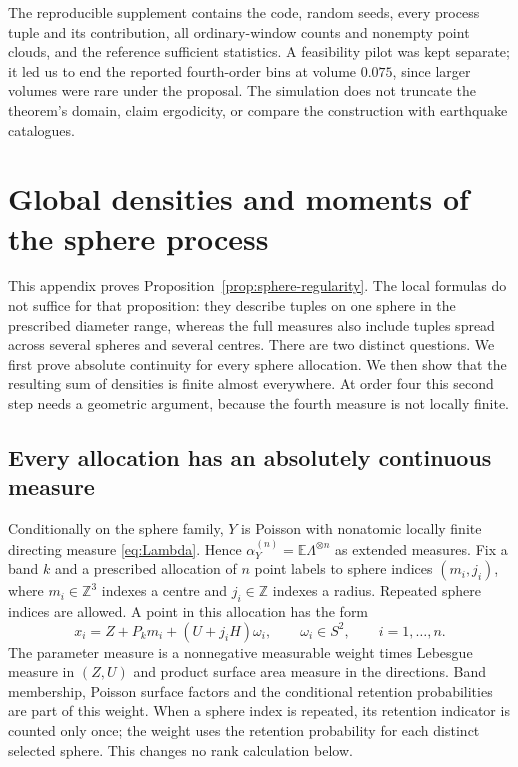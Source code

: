 \documentclass[11pt,a4paper]{article}
\numberwithin{equation}{section}
\theoremstyle{definition}
\theoremstyle{remark}
\newcommand{\E}{\mathbb E}
\begin{document}
The reproducible supplement contains the code, random seeds, every process
tuple and its contribution, all ordinary-window counts and nonempty point
clouds, and the reference sufficient statistics. A feasibility pilot was
kept separate; it led us to end the reported fourth-order bins at volume
$0.075$, since larger volumes were rare under the proposal. The simulation
does not truncate the theorem's domain, claim ergodicity, or compare the
construction with earthquake catalogues.


\appendix

\section{Global densities and moments of the sphere process}
\label{app:regularity}

This appendix proves Proposition~\ref{prop:sphere-regularity}. The local
formulas do not suffice for that proposition: they describe tuples on
one sphere in the prescribed diameter range, whereas the full measures
also include tuples spread across several spheres and several centres.
There are two distinct questions. We first prove absolute continuity for
every sphere allocation. We then show that the resulting sum of densities
is finite almost everywhere. At order four this second step needs a
geometric argument, because the fourth measure is not locally finite.

\subsection{Every allocation has an absolutely continuous measure}
\label{app:submersion}

Conditionally on the sphere family, $Y$ is Poisson with nonatomic locally
finite directing measure \eqref{eq:Lambda}. Hence
$\alpha_Y^{(n)}=\E\Lambda^{\otimes n}$ as extended measures. Fix a band
$k$ and a prescribed allocation of $n$ point labels to sphere indices
$(m_i,j_i)$, where $m_i\in\mathbb Z^3$ indexes a centre and
$j_i\in\mathbb Z$ indexes a radius. Repeated sphere indices are allowed.
A point in this allocation has the form
\begin{equation}
 x_i=Z+P_km_i+(U+j_iH)\omega_i,
 \qquad\omega_i\in S^2,\qquad i=1,\ldots,n.
 \label{eq:allocation-map}
\end{equation}
The parameter measure is a nonnegative measurable weight times Lebesgue
measure in $(Z,U)$ and product surface area measure in the directions.
Band membership, Poisson surface factors and the conditional retention
probabilities are part of this weight. When a sphere index is repeated,
its retention indicator is counted only once; the weight uses the
retention probability for each distinct selected sphere. This changes
no rank calculation below.
\end{document}
